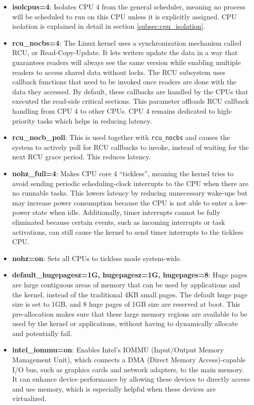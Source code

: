 \documentclass[MMR,Master,english]{twbook}
\begin{document}
\begin{itemize}
	\item \textbf{isolcpus=4}: Isolates CPU 4 from the general scheduler, meaning no process will be scheduled to run on this CPU unless it is explicitly assigned. CPU isolation is explained in detail in section \ref{subsec:cpu_isolation}.
	\item \textbf{rcu\_nocbs=4}: The Linux kernel uses a synchronization mechanism called RCU, or Read-Copy-Update. It lets writers update the data in a way that guarantees readers will always see the same version while enabling multiple readers to access shared data without locks. The RCU subsystem uses callback functions that need to be invoked once readers are done with the data they accessed. By default, these callbacks are handled by the CPUs that executed the read-side critical sections. This parameter offloads RCU callback handling from CPU 4 to other CPUs. CPU 4 remains dedicated to high-priority tasks which helps in reducing latency.
	\item \textbf{rcu\_nocb\_poll}: This is used together with \texttt{rcu\_nocbs} and causes the system to actively poll for RCU callbacks to invoke, instead of waiting for the next RCU grace period. This reduces latency.
	\item \textbf{nohz\_full=4}: Makes CPU core 4 ``tickless'', meaning the kernel tries to avoid sending periodic scheduling-clock interrupts to the CPU when there are no runnable tasks. This lowers latency by reducing unnecessary wake-ups but may increase power consumption because the CPU is not able to enter a low-power state when idle. Additionally, timer interrupts cannot be fully eliminated because certain events, such as incoming interrupts or task activations, can still cause the kernel to send timer interrupts to the tickless CPU.	
	\item \textbf{nohz=on}: Sets all CPUs to tickless mode system-wide.
	\item \textbf{default\_hugepagesz=1G, hugepagesz=1G, hugepages=8}: Huge pages are large contiguous areas of memory that can be used by applications and the kernel, instead of the traditional 4KB small pages. The default huge page size is set to 1GB, and 8 huge pages of 1GB size are reserved at boot. This pre-allocation makes sure that these large memory regions are available to be used by the kernel or applications, without having to dynamically allocate and potentially fail.
	\item \textbf{intel\_iommu=on}: Enables Intel's IOMMU (Input/Output Memory Management Unit), which connects a DMA (Direct Memory Access)-capable I/O bus, such as graphics cards and network adapters, to the main memory. It can enhance device performance by allowing these devices to directly access and use memory, which is especially helpful when these devices are virtualized.

\end{itemize}
\end{document}

